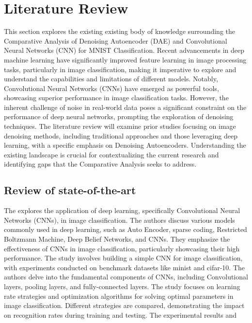 \chapter{Literature Review}
\label{ch:lit_rev} %


This section explores the existing existing body of knowledge surrounding the Comparative Analysis of Denoising Autoencoder (DAE) and Convolutional Neural Networks (CNN) for MNIST Classification. Recent advancements in deep machine learning have significantly improved feature learning in image processing tasks, particularly in image classification, making it imperative to explore and understand the capabilities and limitations of different models. Notably, Convolutional Neural Networks (CNNs) have emerged as powerful tools, showcasing superior performance in image classification tasks. However, the inherent challenge of noise in real-world data poses a significant constraint on the performance of deep neural networks, prompting the exploration of denoising techniques. The literature review will examine prior studies focusing on image denoising methods, including traditional approaches and those leveraging deep learning, with a specific emphasis on Denoising Autoencoders. Understanding the existing landscape is crucial for contextualizing the current research and identifying gaps that the Comparative Analysis seeks to address.

\section{Review of state-of-the-art}
The \citep{8078730} explores the application of deep learning, specifically Convolutional Neural Networks (CNNs), in image classification. The authors discuss various models commonly used in deep learning, such as Auto Encoder, sparse coding, Restricted Boltzmann Machine, Deep Belief Networks, and CNNs. They emphasize the effectiveness of CNNs in image classification, particularly showcasing their high performance. The study involves building a simple CNN for image classification, with experiments conducted on benchmark datasets like minist and cifar-10. The authors delve into the fundamental components of CNNs, including Convolutional layers, pooling layers, and fully-connected layers. The study focuses on learning rate strategies and optimization algorithms for solving optimal parameters in image classification. Different strategies are compared, demonstrating the impact on recognition rates during training and testing. 
The experimental results and 

